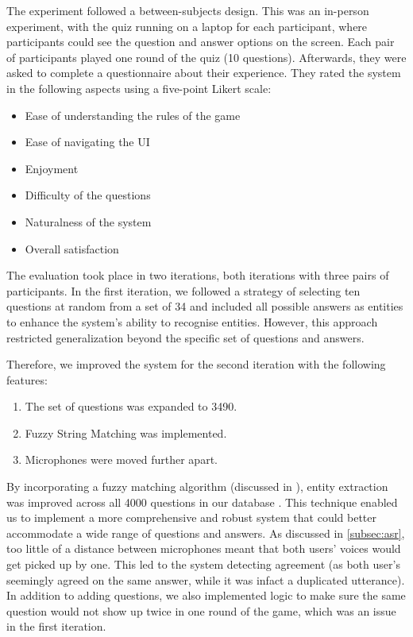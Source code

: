 \documentclass[hidelinks, 11pt]{article}
\begin{document}
The experiment followed a between-subjects design. This was an in-person experiment, with the quiz running on a laptop for each participant, where participants could see the question and answer options on the screen. Each pair of participants played one round of the quiz (10 questions). Afterwards, they were asked to complete a questionnaire about their experience. They rated the system in the following aspects using a five-point Likert scale:

\begin{itemize}
  \item Ease of understanding the rules of the game
  \item Ease of navigating the UI
  \item Enjoyment
  \item Difficulty of the questions
  \item Naturalness of the system
  \item Overall satisfaction
\end{itemize}

The evaluation took place in two iterations, both iterations with three pairs of participants. In the first iteration, we followed a strategy of selecting ten questions at random from a set of 34 and included all possible answers as entities to enhance the system's ability to recognise entities. However, this approach restricted generalization beyond the specific set of questions and answers.

Therefore, we improved the system for the second iteration with the following features:

\begin{enumerate}
  \item The set of questions was expanded to 3490.
  \item Fuzzy String Matching was implemented.
  \item Microphones were moved further apart.
\end{enumerate}

By incorporating a fuzzy matching algorithm (discussed in ), entity extraction was improved across all 4000 questions in our database . This technique enabled us to implement a more comprehensive and robust system that could better accommodate a wide range of questions and answers. As discussed in \cref*{subsec:asr}, too little of a distance between microphones meant that both users' voices would get picked up by one. This led to the system detecting agreement (as both user's seemingly agreed on the same answer, while it was infact a duplicated utterance). In addition to adding questions, we also implemented logic to make sure the same question would not show up twice in one round of the game, which was an issue in the first iteration.
\end{document}
